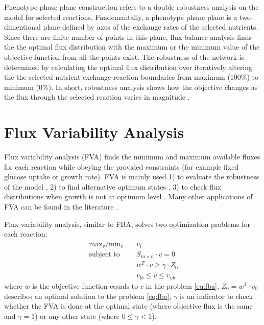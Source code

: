 Phenotype phase plane construction refers to a double robustness analysis on the model for selected reactions. Fundemantally, a phenotype phane plane is a two-dimentional plane defined by axes of the exchange rates of the selected nutrients. Since there are finite number of points in this plane, flux balance analysis finds the the optimal flux distribution with the maximum or the minimum value of the objective function from all the points exist. The robustness of the network is determined by calculating the optimal flux distribution over iteratively altering the the selected nutrient exchange reaction boundaries from maximum (100\%) to minimum (0\%). In short, robustness analysis shows how the objective changes as the flux through the selected reaction varies in magnitude \cite{edwards2002characterizing}.

\section{Flux Variability Analysis}
Flux variability analysis (FVA) finds the minimum and maximum available fluxes for each reaction while obeying the provided constraints (for example fixed glucose uptake or growth rate). FVA is mainly used  1) to evaluate the robustness of the model \cite{thiele2010functional}, 2) to find alternative optimum states \cite{mahadevan2003effects}, 3) to check flux distributions when growth is not at optimum level \cite{reed2004genome}. Many other applications of FVA can be found in the literature \cite{gudmundsson2010computationally}.

\vspace{1cm}
Flux variability analysis, similar to FBA, solves two optimization problems for each reaction:
 \begin{align}
 \ \text{max}_v / \text{min}_v \quad & v_i \\
 \ \text{subject to} \quad & S_{m \times n} \cdot v=0 \\
 \ & w^T \cdot v \geq \gamma \cdot Z_0 \\
 \ & v_{lb} \leq v \leq v_{ub}
 \end{align}
\noindent where $w$ is the objective function equals to $c$ in the problem \ref{eq:fba}, $Z_0 = w^T \cdot v_0$ describes an optimal solution to the problem \ref{eq:fba}, $\gamma$ is an indicator to check whether the FVA is done at the optimal state (where objective flux is the same and $\gamma = 1$) or any other state (where $0 \leq \gamma < 1$).

